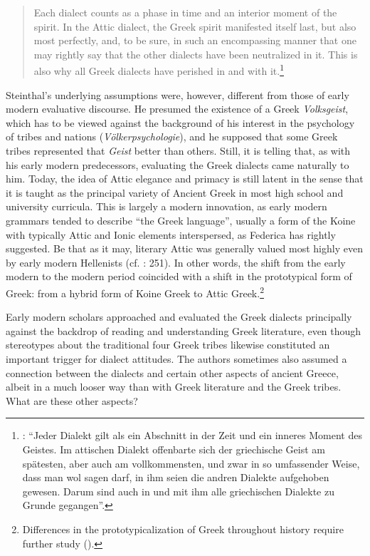 \begin{quote}
Each dialect counts as a phase in time and an interior moment of the spirit. In the Attic dialect, the Greek spirit manifested itself last, but also most perfectly, and, to be sure, in such an encompassing manner that one may rightly say that the other dialects have been neutralized in it. This is also why all Greek dialects have perished in and with it.\footnote{\citet[9]{Steinthal1891}: “Jeder Dialekt gilt als ein Abschnitt in der Zeit und ein inneres Moment des Geistes. Im attischen Dialekt offenbarte sich der griechische Geist am spätesten, aber auch am vollkommensten, und zwar in so umfassender Weise, dass man wol sagen darf, in ihm seien die andren Dialekte aufgehoben gewesen. Darum sind auch in und mit ihm alle griechischen Dialekte zu Grunde gegangen”.}
\end{quote}

Steinthal’s underlying assumptions were, however, different from those of early modern evaluative discourse. He presumed the existence of a Greek \textit{Volksgeist}, which has to be viewed against the background of his interest in the psychology of tribes and nations (\textit{Völkerpsychologie}), and he supposed that some Greek tribes represented that \textit{Geist} better than others. Still, it is telling that, as with his early modern predecessors, evaluating the Greek dialects came naturally to him. Today, the idea of Attic elegance and primacy is still latent in the sense that it is taught as the principal variety of Ancient Greek in most high school and university curricula. This is largely a modern innovation, as early modern grammars tended to describe “the Greek language”, usually a form of the Koine with typically Attic and Ionic elements interspersed, as Federica \citet[123]{Ciccolella2008} has rightly suggested. Be that as it may, literary Attic was generally valued most highly even by early modern Hellenists (cf. \citealt{Roelcke2014}: 251). In other words, the shift from the early modern to the modern period coincided with a shift in the prototypical form of Greek: from a hybrid form of Koine Greek to Attic Greek.\footnote{Differences in the prototypicalization of Greek throughout history require further study (\citealt{VanRooyFcb}).}

Early modern scholars approached and evaluated the Greek dialects principally against the backdrop of reading and understanding Greek literature, even though stereotypes about the traditional four Greek tribes likewise constituted an important trigger for dialect attitudes. The authors sometimes also assumed a connection between the dialects and certain other aspects of ancient Greece, albeit in a much looser way than with Greek literature and the Greek tribes. What are these other aspects?

